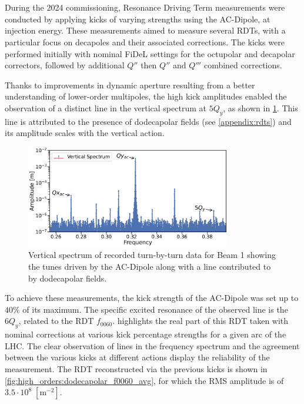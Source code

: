 \section{}


During the 2024 commissioning, Resonance Driving Term measurements were conducted by applying
kicks of varying strengths using the AC-Dipole, at injection energy. These measurements aimed to
measure several RDTs, with a particular focus on decapoles and their associated corrections. The
kicks were performed initially with nominal FiDeL settings for the octupolar and decapolar
correctors, followed by additional $Q''$ then $Q''$ and $Q'''$ combined corrections.

Thanks to improvements in dynamic aperture resulting from a better understanding of lower-order
multipoles, the high kick amplitudes enabled the observation of a distinct line in the vertical
spectrum at $5Q_y$, as shown in \cref{fig:high_orders:spectrum_dodecapole_5qy}. This line is
attributed to the presence of dodecapolar fields (see \cref{appendix:rdts}) and its amplitude scales
with the vertical action.

\begin{figure}[!htb]
    \centering
    \includegraphics[width=0.8\textwidth]{./images/spectrum_dodecapole_5qy.pdf}
    \caption{Vertical spectrum of recorded turn-by-turn data for Beam 1 showing the tunes driven by
    the AC-Dipole along with a line contributed to by dodecapolar fields.}
    \label{fig:high_orders:spectrum_dodecapole_5qy}
\end{figure}

To achieve these measurements, the kick strength of the AC-Dipole was set up to $40\%$ of its
maximum. The specific excited resonance of the observed line is the $6Q_y$, related to the RDT
$f_{0060}$.
 highlights the real part of this RDT taken with nominal
corrections at various kick percentage strengths for a given arc of the LHC.
The clear observation of lines in the frequency spectrum and the agreement between the various
kicks at different actions display the reliability of the measurement.
The RDT reconstructed via the previous kicks is shown in
\cref{fig:high_orders:dodecapolar_f0060_avg}, for which the RMS amplitude is of
$3.5\cdot10^8\;[\text{m}^{-2}]$.

